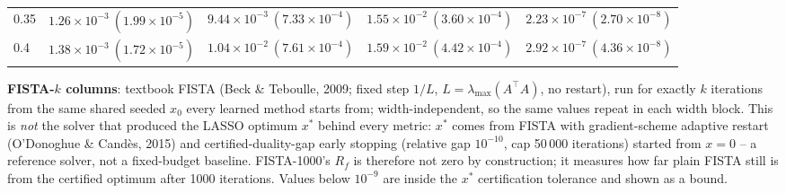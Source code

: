 \begin{table}[htbp]
\begin{tabular}{@{} l rrrr @{}}
0.35 & $1.26\!\times\!10^{-3}\ (1.99\!\times\!10^{-5})$ & $9.44\!\times\!10^{-3}\ (7.33\!\times\!10^{-4})$ & $1.55\!\times\!10^{-2}\ (3.60\!\times\!10^{-4})$ & $2.23\!\times\!10^{-7}\ (2.70\!\times\!10^{-8})$ \\
0.4 & $1.38\!\times\!10^{-3}\ (1.72\!\times\!10^{-5})$ & $1.04\!\times\!10^{-2}\ (7.61\!\times\!10^{-4})$ & $1.59\!\times\!10^{-2}\ (4.42\!\times\!10^{-4})$ & $2.92\!\times\!10^{-7}\ (4.36\!\times\!10^{-8})$ \\
\bottomrule
\end{tabular}
\vspace{2pt}
\begin{minipage}{\linewidth}\footnotesize
\textbf{FISTA-$k$ columns}: textbook FISTA (Beck \& Teboulle, 2009; fixed step $1/L$, $L = \lambda_{\max}(A^\top A)$, no restart), run for exactly $k$ iterations from the same shared seeded $x_0$ every learned method starts from; width-independent, so the same values repeat in each width block. This is \emph{not} the solver that produced the LASSO optimum $x^*$ behind every metric: $x^*$ comes from FISTA with gradient-scheme adaptive restart (O'Donoghue \& Cand\`es, 2015) and certified-duality-gap early stopping (relative gap $10^{-10}$, cap 50\,000 iterations) started from $x = 0$ -- a reference solver, not a fixed-budget baseline. FISTA-1000's $R_f$ is therefore not zero by construction; it measures how far plain FISTA still is from the certified optimum after 1000 iterations. Values below $10^{-9}$ are inside the $x^*$ certification tolerance and shown as a bound.
\end{minipage}
\end{table}

